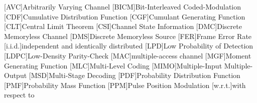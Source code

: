 [AVC]{Arbitrarily Varying Channel}
[BICM]{Bit-Interleaved Coded-Modulation}
[CDF]{Cumulative Distribution Function}
[CGF]{Cumulant Generating Function}
[CLT]{Central Limit Theorem}
[CSI]{Channel State Information}
[DMC]{Discrete Memoryless Channel}
[DMS]{Discrete Memoryless Source}
[FER]{Frame Error Rate}
[i.i.d.]{independent and identically distributed}
[LPD]{Low Probability of Detection}
[LDPC]{Low-Density Parity-Check}
[MAC]{multiple-access channel}
[MGF]{Moment Generating Function}
[MLC]{Multi-Level Coding}
[MIMO]{Multiple-Input Multiple-Output}
[MSD]{Multi-Stage Decoding}
[PDF]{Probability Distribution Function}
[PMF]{Probability Mass Function}
[PPM]{Pulse Position Modulation}
[w.r.t.]{with respect to}
